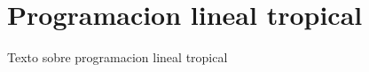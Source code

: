 \section{Programacion lineal tropical}
\label{sec:programacion-lineal-tropical}
Texto sobre programacion lineal tropical
